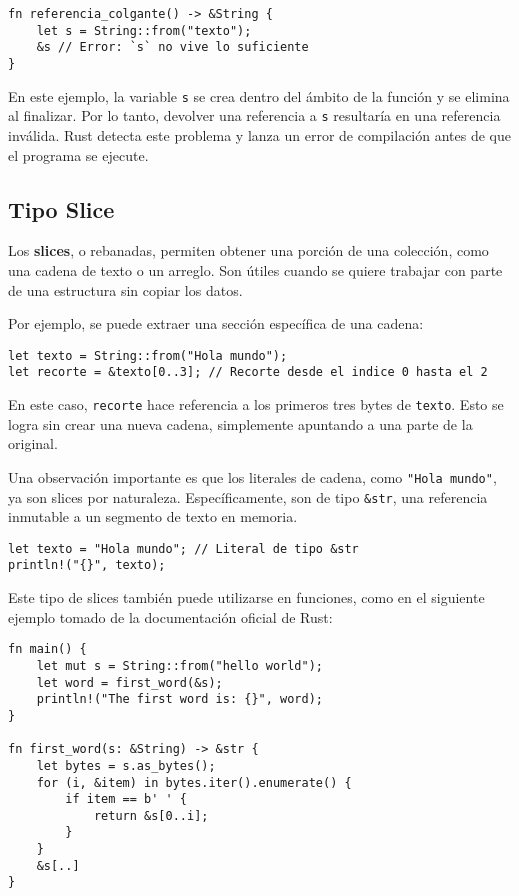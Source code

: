 \documentclass[12pt]{article}
\begin{document}
\begin{lstlisting}[style=ruststyle]
fn referencia_colgante() -> &String {
	let s = String::from("texto");
	&s // Error: `s` no vive lo suficiente
}
\end{lstlisting}

En este ejemplo, la variable \texttt{s} se crea dentro del ámbito de la función y se elimina al finalizar. Por lo tanto, devolver una referencia a \texttt{s} resultaría en una referencia inválida. Rust detecta este problema y lanza un error de compilación antes de que el programa se ejecute.


\subsection{Tipo Slice}

Los \textbf{slices}, o rebanadas, permiten obtener una porción de una colección, como una cadena de texto o un arreglo. Son útiles cuando se quiere trabajar con parte de una estructura sin copiar los datos.

Por ejemplo, se puede extraer una sección específica de una cadena:

\begin{lstlisting}[style=ruststyle]
let texto = String::from("Hola mundo");
let recorte = &texto[0..3]; // Recorte desde el indice 0 hasta el 2
\end{lstlisting}

En este caso, \texttt{recorte} hace referencia a los primeros tres bytes de \texttt{texto}. Esto se logra sin crear una nueva cadena, simplemente apuntando a una parte de la original.

Una observación importante es que los literales de cadena, como \texttt{"Hola mundo"}, ya son slices por naturaleza. Específicamente, son de tipo \texttt{\&str}, una referencia inmutable a un segmento de texto en memoria.

\begin{lstlisting}[style=ruststyle]
let texto = "Hola mundo"; // Literal de tipo &str
println!("{}", texto);
\end{lstlisting}

Este tipo de slices también puede utilizarse en funciones, como en el siguiente ejemplo tomado de la documentación oficial de Rust:

\begin{lstlisting}[style=ruststyle]
fn main() {
	let mut s = String::from("hello world");
	let word = first_word(&s);
	println!("The first word is: {}", word);
}

fn first_word(s: &String) -> &str {
	let bytes = s.as_bytes();
	for (i, &item) in bytes.iter().enumerate() {
		if item == b' ' {
			return &s[0..i];
		}
	}
	&s[..]
}
\end{lstlisting}
\end{document}
